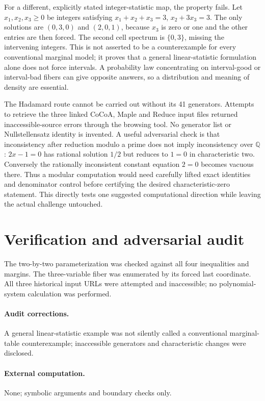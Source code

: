 \documentclass[11pt]{article}
\begin{document}
For a different, explicitly stated integer-statistic map, the property fails.
Let $x_1,x_2,x_3\ge0$ be integers satisfying
$x_1+x_2+x_3=3$, $x_2+3x_3=3$.
The only solutions are $(0,3,0)$ and $(2,0,1)$, because $x_3$ is zero or one
and the other entries are then forced. The second cell spectrum is
$\{0,3\}$, missing the intervening integers. This is not asserted to be a
counterexample for every conventional marginal model; it proves that a
general linear-statistic formulation alone does not force intervals.
A probability law concentrating on interval-good or interval-bad fibers can
give opposite answers, so a distribution and meaning of density are essential.

The Hadamard route cannot be carried out without its 41 generators. Attempts
to retrieve the three linked CoCoA, Maple and Reduce input files returned
inaccessible-source errors through the browsing tool. No generator list or
Nullstellensatz identity is invented. A useful adversarial check is that
inconsistency after reduction modulo a prime does not imply inconsistency over
$\mathbb Q$: $2x-1=0$ has rational solution $1/2$ but reduces to $1=0$ in
characteristic two. Conversely the rationally inconsistent constant equation
$2=0$ becomes vacuous there. Thus a modular computation would need carefully
lifted exact identities and denominator control before certifying the desired
characteristic-zero statement. This directly tests one suggested computational
direction while leaving the actual challenge untouched.
\section{Verification and adversarial audit}
The two-by-two parameterization was checked against all four inequalities
and margins. The three-variable fiber was enumerated by its forced last
coordinate. All three historical input URLs were attempted and inaccessible;
no polynomial-system calculation was performed.
\paragraph{Audit corrections.} A general linear-statistic example was not silently called a conventional marginal-table counterexample; inaccessible generators and characteristic changes were disclosed.
\paragraph{External computation.} None; symbolic arguments and boundary checks only.
\end{document}
